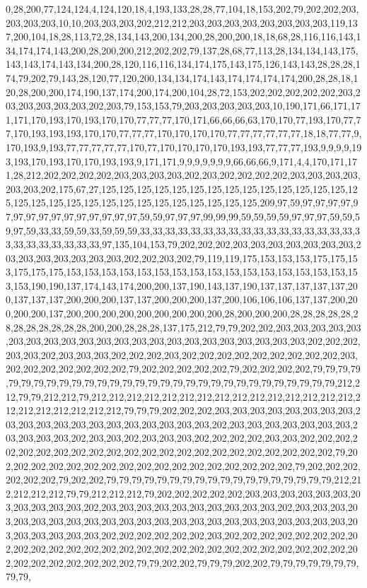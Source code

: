 0,28,200,77,124,124,4,124,120,18,4,193,133,28,28,77,104,18,153,202,79,202,202,203,203,203,203,10,10,203,203,203,202,212,212,203,203,203,203,203,203,203,203,119,137,200,104,18,28,113,72,28,134,143,200,134,200,28,200,200,18,18,68,28,116,116,143,134,174,174,143,200,28,200,200,212,202,202,79,137,28,68,77,113,28,134,134,143,175,143,143,174,143,134,200,28,120,116,116,134,174,175,143,175,126,143,143,28,28,28,174,79,202,79,143,28,120,77,120,200,134,134,174,143,174,174,174,174,200,28,28,18,120,28,200,200,174,190,137,174,200,174,200,104,28,72,153,202,202,202,202,202,203,203,203,203,203,203,202,203,79,153,153,79,203,203,203,203,203,10,190,171,66,171,171,171,170,193,170,193,170,170,77,77,77,170,171,66,66,66,63,170,170,77,193,170,77,77,170,193,193,193,170,170,77,77,77,170,170,170,170,77,77,77,77,77,77,18,18,77,77,9,170,193,9,193,77,77,77,77,77,170,77,170,170,170,170,193,193,77,77,77,193,9,9,9,9,193,193,170,193,170,170,193,193,9,171,171,9,9,9,9,9,9,9,66,66,66,9,171,4,4,170,171,171,28,212,202,202,202,202,203,203,203,203,202,203,202,202,202,202,203,203,203,203,203,203,202,175,67,27,125,125,125,125,125,125,125,125,125,125,125,125,125,125,125,125,125,125,125,125,125,125,125,125,125,125,125,125,125,209,97,59,97,97,97,97,97,97,97,97,97,97,97,97,97,97,97,59,59,97,97,97,99,99,99,59,59,59,59,97,97,97,59,59,59,97,59,33,33,59,59,33,59,59,59,33,33,33,33,33,33,33,33,33,33,33,33,33,33,33,33,33,33,33,33,33,33,33,33,33,97,135,104,153,79,202,202,202,203,203,203,203,203,203,203,203,203,203,203,203,203,203,202,202,203,202,79,119,119,175,153,153,153,175,175,153,175,175,175,153,153,153,153,153,153,153,153,153,153,153,153,153,153,153,153,153,153,190,190,137,174,143,174,200,200,137,190,143,137,190,137,137,137,137,137,200,137,137,137,200,200,200,137,137,200,200,200,137,200,106,106,106,137,137,200,200,200,200,137,200,200,200,200,200,200,200,200,200,28,200,200,200,28,28,28,28,28,28,28,28,28,28,28,28,200,200,28,28,28,137,175,212,79,79,202,202,203,203,203,203,203,203,203,203,203,203,203,203,203,203,203,203,203,203,203,203,203,203,202,202,202,203,203,202,203,203,203,202,202,202,203,202,202,202,202,202,202,202,202,202,203,202,202,202,202,202,202,202,79,202,202,202,202,202,79,202,202,202,202,79,79,79,79,79,79,79,79,79,79,79,79,79,79,79,79,79,79,79,79,79,79,79,79,79,79,79,79,79,79,212,212,79,79,212,212,79,212,212,212,212,212,212,212,212,212,212,212,212,212,212,212,212,212,212,212,212,212,212,79,79,79,202,202,202,203,203,203,203,203,203,203,203,203,203,203,203,203,203,203,203,203,203,203,203,202,203,203,203,203,203,203,203,203,203,203,203,202,203,203,202,203,203,203,202,202,202,202,203,203,202,202,202,202,202,202,202,202,202,202,202,202,202,202,202,202,202,202,202,202,202,202,79,202,202,202,202,202,202,202,202,202,202,202,202,202,202,202,202,202,79,202,202,202,202,202,202,79,202,202,79,79,79,79,79,79,79,79,79,79,79,79,79,79,79,79,79,79,212,212,212,212,212,79,79,212,212,212,79,202,202,202,202,202,203,203,203,203,203,203,203,203,203,203,203,202,203,203,203,203,203,203,203,203,203,203,202,203,203,203,203,203,203,203,203,203,203,203,203,203,203,203,203,203,203,203,203,203,203,203,203,203,203,203,203,203,202,202,202,202,202,202,203,202,202,202,202,202,202,202,202,202,202,202,202,202,202,202,202,202,202,202,202,202,202,202,202,202,202,202,202,202,202,202,202,202,202,202,79,79,202,202,79,79,79,202,202,79,79,79,79,79,79,79,79,79,